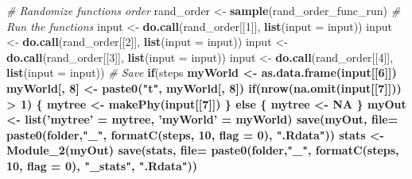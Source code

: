 \documentclass[]{book}
\newenvironment{Shaded}{\begin{snugshade}}{\end{snugshade}}
\newcommand{\KeywordTok}[1]{\textcolor[rgb]{0.13,0.29,0.53}{\textbf{{#1}}}}
\newcommand{\DataTypeTok}[1]{\textcolor[rgb]{0.13,0.29,0.53}{{#1}}}
\newcommand{\DecValTok}[1]{\textcolor[rgb]{0.00,0.00,0.81}{{#1}}}
\newcommand{\StringTok}[1]{\textcolor[rgb]{0.31,0.60,0.02}{{#1}}}
\newcommand{\CommentTok}[1]{\textcolor[rgb]{0.56,0.35,0.01}{\textit{{#1}}}}
\newcommand{\OtherTok}[1]{\textcolor[rgb]{0.56,0.35,0.01}{{#1}}}
\newcommand{\ControlFlowTok}[1]{\textcolor[rgb]{0.13,0.29,0.53}{\textbf{{#1}}}}
\newcommand{\OperatorTok}[1]{\textcolor[rgb]{0.81,0.36,0.00}{\textbf{{#1}}}}
\newcommand{\NormalTok}[1]{{#1}}
\theoremstyle{definition}
\theoremstyle{definition}
\theoremstyle{remark}
\begin{document}
\begin{Shaded}
\begin{Highlighting}[]
{{{    \CommentTok{# Randomize functions order}
\NormalTok{    rand_order <-}\StringTok{ }\KeywordTok{sample}\NormalTok{(rand_order_func_run)}
    \CommentTok{# Run the functions}
\NormalTok{    input <-}\StringTok{ }\KeywordTok{do.call}\NormalTok{(rand_order[[}\DecValTok{1}\NormalTok{]], }\KeywordTok{list}\NormalTok{(}\DataTypeTok{input =}\NormalTok{ input))}
\NormalTok{    input <-}\StringTok{ }\KeywordTok{do.call}\NormalTok{(rand_order[[}\DecValTok{2}\NormalTok{]], }\KeywordTok{list}\NormalTok{(}\DataTypeTok{input =}\NormalTok{ input))}
\NormalTok{    input <-}\StringTok{ }\KeywordTok{do.call}\NormalTok{(rand_order[[}\DecValTok{3}\NormalTok{]], }\KeywordTok{list}\NormalTok{(}\DataTypeTok{input =}\NormalTok{ input))}
\NormalTok{    input <-}\StringTok{ }\KeywordTok{do.call}\NormalTok{(rand_order[[}\DecValTok{4}\NormalTok{]], }\KeywordTok{list}\NormalTok{(}\DataTypeTok{input =}\NormalTok{ input))}
    \CommentTok{# Save}
    \ControlFlowTok{if}\NormalTok{(steps }\OperatorTok{%
\NormalTok{      myWorld <-}\StringTok{ }\KeywordTok{as.data.frame}\NormalTok{(input[[}\DecValTok{6}\NormalTok{]])}
\NormalTok{      myWorld[, }\DecValTok{8}\NormalTok{] <-}\StringTok{ }\KeywordTok{paste0}\NormalTok{(}\StringTok{"t"}\NormalTok{, myWorld[, }\DecValTok{8}\NormalTok{])}
      \ControlFlowTok{if}\NormalTok{(}\KeywordTok{nrow}\NormalTok{(}\KeywordTok{na.omit}\NormalTok{(input[[}\DecValTok{7}\NormalTok{]])) }\OperatorTok{>}\StringTok{ }\DecValTok{1}\NormalTok{) \{}
\NormalTok{        mytree <-}\StringTok{ }\KeywordTok{makePhy}\NormalTok{(input[[}\DecValTok{7}\NormalTok{]])}
\NormalTok{      \} }\ControlFlowTok{else}\NormalTok{ \{}
\NormalTok{        mytree <-}\StringTok{ }\OtherTok{NA}
\NormalTok{      \}}
\NormalTok{      myOut <-}\StringTok{ }\KeywordTok{list}\NormalTok{(}\StringTok{'mytree'}\NormalTok{ =}\StringTok{ }\NormalTok{mytree, }\StringTok{'myWorld'}\NormalTok{ =}\StringTok{ }\NormalTok{myWorld)}
      \KeywordTok{save}\NormalTok{(myOut, }\DataTypeTok{file=} \KeywordTok{paste0}\NormalTok{(folder,}\StringTok{"_"}\NormalTok{, }\KeywordTok{formatC}\NormalTok{(steps, }\DecValTok{10}\NormalTok{, }\DataTypeTok{flag =} \DecValTok{0}\NormalTok{), }\StringTok{".Rdata"}\NormalTok{))}
\NormalTok{      stats <-}\StringTok{ }\KeywordTok{Module_2}\NormalTok{(myOut)}
      \KeywordTok{save}\NormalTok{(stats, }\DataTypeTok{file=} \KeywordTok{paste0}\NormalTok{(folder,}\StringTok{"_"}\NormalTok{, }\KeywordTok{formatC}\NormalTok{(steps, }\DecValTok{10}\NormalTok{, }\DataTypeTok{flag =} \DecValTok{0}\NormalTok{),}
                               \StringTok{"_stats"}\NormalTok{, }\StringTok{".Rdata"}\NormalTok{))}
}}}}
\end{Highlighting}
\end{Shaded}
\end{document}
